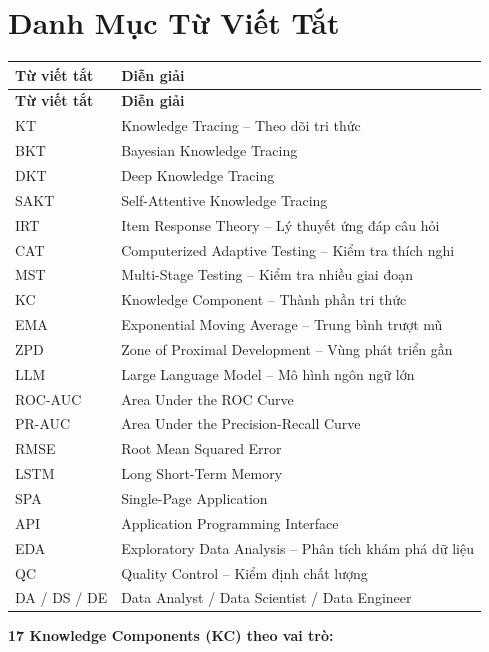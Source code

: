 \chapter*{Danh Mục Từ Viết Tắt}

\begin{longtable}{ll}
\toprule
\textbf{Từ viết tắt} & \textbf{Diễn giải} \\
\midrule
\endfirsthead
\toprule
\textbf{Từ viết tắt} & \textbf{Diễn giải} \\
\midrule
\endhead
\bottomrule
\endfoot
KT     & Knowledge Tracing -- Theo dõi tri thức \\
BKT    & Bayesian Knowledge Tracing \\
DKT    & Deep Knowledge Tracing \\
SAKT   & Self-Attentive Knowledge Tracing \\
IRT    & Item Response Theory -- Lý thuyết ứng đáp câu hỏi \\
CAT    & Computerized Adaptive Testing -- Kiểm tra thích nghi \\
MST    & Multi-Stage Testing -- Kiểm tra nhiều giai đoạn \\
KC     & Knowledge Component -- Thành phần tri thức \\
EMA    & Exponential Moving Average -- Trung bình trượt mũ \\
ZPD    & Zone of Proximal Development -- Vùng phát triển gần \\
LLM    & Large Language Model -- Mô hình ngôn ngữ lớn \\
ROC-AUC & Area Under the ROC Curve \\
PR-AUC & Area Under the Precision-Recall Curve \\
RMSE   & Root Mean Squared Error \\
LSTM   & Long Short-Term Memory \\
SPA    & Single-Page Application \\
API    & Application Programming Interface \\
EDA    & Exploratory Data Analysis -- Phân tích khám phá dữ liệu \\
QC     & Quality Control -- Kiểm định chất lượng \\
DA / DS / DE & Data Analyst / Data Scientist / Data Engineer \\
\end{longtable}

\noindent\textbf{17 Knowledge Components (KC) theo vai trò:}

